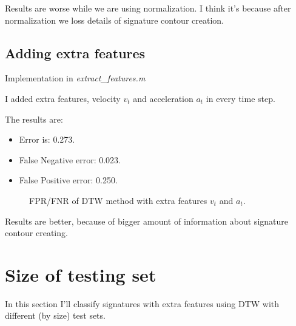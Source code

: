 \documentclass{article}
\begin{document}
\newpage

Results are worse while we are using normalization. I think it's because after normalization we loss details of signature contour creation.

\subsection{Adding extra features}

Implementation in \textit{extract\_features.m}

I added extra features, velocity \(v_t\) and acceleration \(a_t\) in every time step.

The results are:
\begin{itemize}
  \item Error is: 0.273.
  \item False Negative error: 0.023.
  \item False Positive error: 0.250.
\end{itemize}

\begin{figure}[htbp] 
  \centering
  \def\svgscale{0.7}
  
  \caption{FPR/FNR of DTW method with extra features \(v_t\) and \(a_t\).}
  \label{DTW_extra_features}
\end{figure}

Results are better, because of bigger amount of information about signature contour creating.

\section{Size of testing set}
In this section I'll classify signatures with extra features using DTW with different (by size) test sets.
\end{document}
